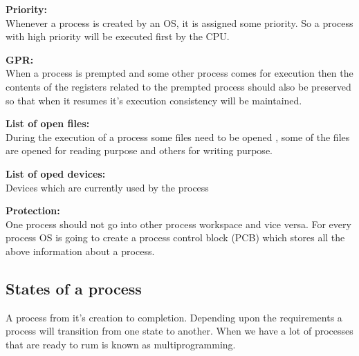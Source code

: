 \documentclass[12pt,letterpaper]{article}
\begin{document}
\textbf{Priority:}\\
Whenever a process is created by an OS, it is assigned some priority. So a process with high priority will be executed first by the CPU. 

\textbf{GPR:}\\
When a process is prempted and some other process comes for execution then the contents of the registers related to the prempted process should also be preserved so that when it resumes it's execution consistency will be maintained.

\textbf{List of open files:}\\
During the execution of a process some files need to be opened , some of the files are opened for reading purpose and others for writing purpose. 

\textbf{List of oped devices:}\\
Devices which are currently used by the process 

\textbf{Protection:}\\
One process should not go into other process workspace and vice versa. For every process OS is going to create a process control block (PCB) which stores all the above information about a process. 

\subsection{States of a process} 
A process from it's creation to completion. Depending upon the requirements a process will transition from one state to another. 
When we have a lot of processes that are ready to rum is known as multiprogramming. 
\end{document}
